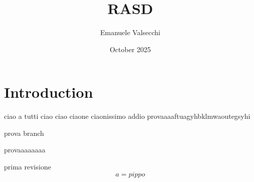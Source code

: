 \documentclass{article}
\title{RASD}
\author{Emanuele Valsecchi}
\date{October 2025}
\begin{document}
\maketitle

\section{Introduction}

ciao a tutti
ciao ciao
ciaone
ciaonissimo
addio
provaaaaftuagyhbklmwaoutegsyhi

prova
branch

provaaaaaaaa

prima revisione\begin{equation}
    a = pippo
\end{equation}
\end{document}
